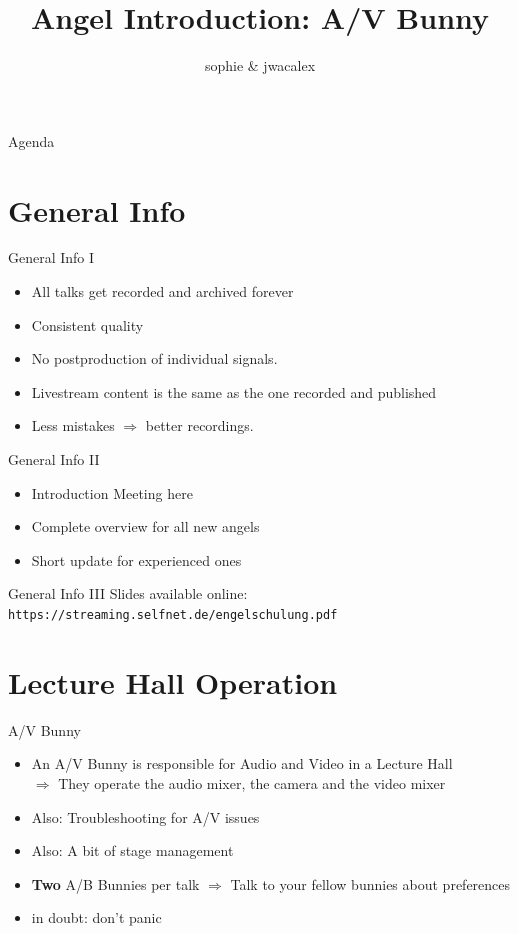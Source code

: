 \documentclass[aspectratio=169]{beamer}
\title{Angel Introduction: A/V Bunny}
\author{sophie \& jwacalex}
\institute{C3VOC}
\begin{document}
\maketitle


\begin{frame}{Agenda}
\tableofcontents
\end{frame}


\section{General Info}
\begin{frame}{General Info I}
	\begin{itemize}
		\item All talks get recorded and archived forever
		\item Consistent quality
		\item No postproduction of individual signals.
		\item Livestream content is the same as the one recorded and published
		\item Less mistakes $\Rightarrow$ better recordings.
	\end{itemize}
\end{frame}


\begin{frame}{General Info II}
	\begin{itemize}
		\item Introduction Meeting here
		\item Complete overview for all new angels
		\item Short update for experienced ones
	\end{itemize}
\end{frame}

\begin{frame}{General Info III}
Slides available online: \texttt{https://streaming.selfnet.de/engelschulung.pdf}

	\begin{figure} 
		\centering
	\end{figure}
\end{frame}

\section{Lecture Hall Operation}
\begin{frame}{A/V Bunny}
	\begin{itemize}
		\item An A/V Bunny is responsible for Audio and Video in a Lecture Hall\\
		$\Rightarrow$ They operate the audio mixer, the camera and the video mixer
		\item Also: Troubleshooting for A/V issues
		\item Also: A bit of stage management
		\item \textbf{Two} A/B Bunnies per talk $\Rightarrow$  Talk to your fellow bunnies about preferences
		\item in doubt: don't panic
	\end{itemize}
\end{frame}
\end{document}
